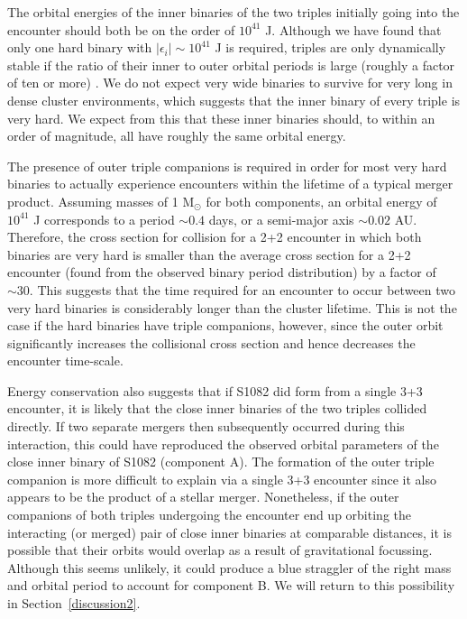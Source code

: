 \begin{enumerate}
The orbital energies of the inner binaries of the two triples
initially going into the encounter should both be on the order of
$10^{41}$ J.  Although we have found
that only one hard binary with $|\epsilon_i| \sim 
10^{41}$ J is required, triples are only dynamically stable if the
ratio of their inner to outer orbital periods is large
(roughly a factor of ten or more) \citep[e.g.][]{mardling01}.  We do
not expect very wide binaries to survive for very long in dense
cluster environments, which suggests that the inner binary of every
triple is very hard.  We expect from this that these inner binaries
should, to within an order of magnitude, all have roughly the same
orbital energy.  

The presence of outer triple companions is required in order for most
very hard binaries to actually experience encounters within the
lifetime of a typical merger product.  Assuming masses of 1
M$_{\odot}$ for both components, an orbital energy of $10^{41}$ J
corresponds to a period $\sim 0.4$ days, or a semi-major axis $\sim
0.02$ AU.  Therefore, the cross section for collision for a 2+2 encounter
in which both binaries are very hard is smaller than the average
cross section for a 2+2 encounter (found from the observed binary
period distribution) by a factor of $\sim 30$.  This suggests that the
time required for an 
encounter to occur between two very hard binaries is considerably
longer than the cluster lifetime.  This is not the case if the hard
binaries have triple companions, however, since the outer orbit
significantly increases the collisional cross section and hence
decreases the encounter time-scale.  

Energy conservation also suggests that if S1082 did form from a single 3+3
encounter, it is likely that the close inner binaries of the two triples
collided directly.  
If two separate mergers then subsequently occurred during this
interaction, this could have reproduced the observed orbital
parameters 
of the close inner binary of S1082 (component A).  The formation of
the outer triple companion is more difficult to explain via a
single 3+3 encounter since it also appears to be the product of a
stellar merger.  Nonetheless, if the outer companions of both triples
undergoing the encounter end up orbiting the interacting (or merged) 
pair of close inner binaries at comparable distances, it is possible
that their orbits would overlap as a result of gravitational focussing.
Although this seems unlikely, it could produce a blue straggler of the
right mass and orbital period to account for component B.  We 
will return to this possibility in Section~\ref{discussion2}. 

\end{enumerate}

